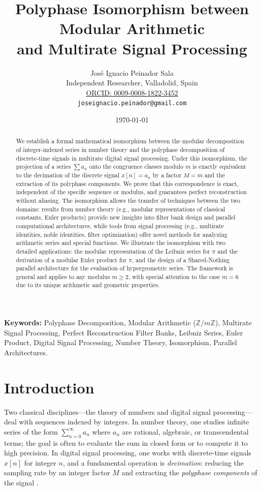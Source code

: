 \documentclass[12pt,a4paper]{article}
\title{\textbf{Polyphase Isomorphism between Modular Arithmetic\\ and Multirate Signal Processing}}
\author{José Ignacio Peinador Sala\\
\small Independent Researcher, Valladolid, Spain\\
\small \href{https://orcid.org/0009-0008-1822-3452}{ORCID: 0009-0008-1822-3452}\\
\small \texttt{joseignacio.peinador@gmail.com}}
\date{\today}
\theoremstyle{plain}
\theoremstyle{definition}
\theoremstyle{remark}
\begin{document}
\maketitle

\begin{abstract}
We establish a formal mathematical isomorphism between the modular decomposition of integer-indexed series in number theory and the polyphase decomposition of discrete-time signals in multirate digital signal processing. Under this isomorphism, the projection of a series \(\sum a_n\) onto the congruence classes modulo \(m\) is exactly equivalent to the decimation of the discrete signal \(x[n] = a_n\) by a factor \(M=m\) and the extraction of its polyphase components. We prove that this correspondence is exact, independent of the specific sequence or modulus, and guarantees perfect reconstruction without aliasing. The isomorphism allows the transfer of techniques between the two domains: results from number theory (e.g., modular representations of classical constants, Euler products) provide new insights into filter bank design and parallel computational architectures, while tools from signal processing (e.g., multirate identities, noble identities, filter optimization) offer novel methods for analyzing arithmetic series and special functions. We illustrate the isomorphism with two detailed applications: the modular representation of the Leibniz series for \(\pi\) and the derivation of a modular Euler product for \(\pi\), and the design of a Shared-Nothing parallel architecture for the evaluation of hypergeometric series. The framework is general and applies to any modulus \(m \ge 2\), with special attention to the case \(m=6\) due to its unique arithmetic and geometric properties.
\end{abstract}
\vspace{1em}
\noindent\textbf{Keywords:} Polyphase Decomposition, Modular Arithmetic (\(\mathbb{Z}/m\mathbb{Z}\)), Multirate Signal Processing, Perfect Reconstruction Filter Banks, Leibniz Series, Euler Product, Digital Signal Processing, Number Theory, Isomorphism, Parallel Architectures.

\section{Introduction}
Two classical disciplines---the theory of numbers and digital signal processing---deal with sequences indexed by integers. In number theory, one studies infinite series of the form \(\sum_{n=0}^{\infty} a_n\) where \(a_n\) are rational, algebraic, or transcendental terms; the goal is often to evaluate the sum in closed form or to compute it to high precision. In digital signal processing, one works with discrete-time signals \(x[n]\) for integer \(n\), and a fundamental operation is \emph{decimation}: reducing the sampling rate by an integer factor \(M\) and extracting the \emph{polyphase components} of the signal \cite{vaidyanathan}.
\end{document}
